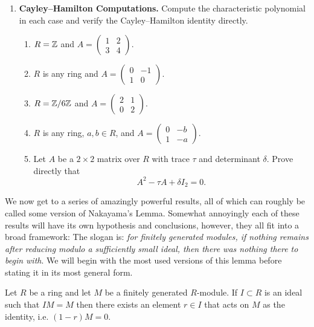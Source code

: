 \documentclass[12pt,reqno]{amsart}
\begin{document}
\begin{enumerate}[leftmargin=*, resume=problems]
\item \textbf{Cayley--Hamilton Computations.} Compute the characteristic polynomial in each case and verify the Cayley--Hamilton identity directly.
\begin{enumerate}
    \item $R=\mathbb{Z}$ and $A=\begin{pmatrix}1&2\\3&4\end{pmatrix}$.
    \item $R$ is any ring and $A=\begin{pmatrix}0&-1\\1&0\end{pmatrix}$.
    \item $R=\mathbb{Z}/6\mathbb{Z}$ and $A=\begin{pmatrix}2&1\\0&2\end{pmatrix}$.
    \item $R$ is any ring, $a,b\in R$, and $A=\begin{pmatrix}0&-b\\1&-a\end{pmatrix}$.
    \item Let $A$ be a $2\times 2$ matrix over $R$ with trace $\tau$ and determinant $\delta$. Prove directly that
    \[
    A^2-\tau A+\delta I_2=0.
    \]
\end{enumerate}


\end{enumerate}

\hrulefill

We now get to a series of amazingly powerful results, all of which can roughly be called some version of Nakayama's Lemma. Somewhat annoyingly each of these results will have its own hypothesis and conclusions, however, they all fit into a broad framework: The slogan is: \emph{for finitely generated modules, if nothing remains after reducing modulo a sufficiently small ideal, then there was nothing there to begin with}. We will begin with the most used versions of this lemma before stating it in its most general form.


\begin{lemma}
	Let $R$ be a ring and let $M$ be a finitely generated $R$-module. If $I \subset R$ is an ideal such that $IM=M$ then there exists an element $r\in I$ that acts on $M$ as the identity, i.e. $(1-r)M=0$.
\end{lemma}
\end{document}
